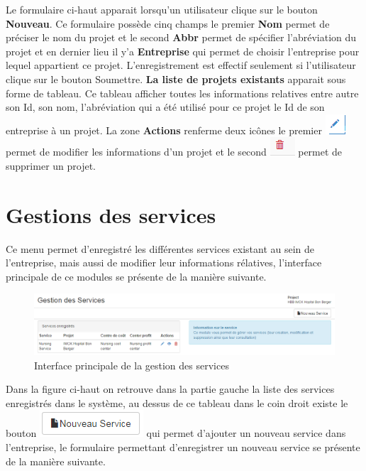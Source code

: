 \documentclass[12pt,a4paper]{report}
\begin{document}
Le formulaire ci-haut apparait lorsqu'un utilisateur clique sur le bouton \textbf{Nouveau}. Ce formulaire possède cinq champs le premier \textbf{Nom} permet de préciser le nom du projet et le second \textbf{Abbr} permet de spécifier l'abréviation du projet et en dernier lieu il y'a \textbf{Entreprise} qui permet de choisir l'entreprise pour lequel appartient ce projet.
L'enregistrement est effectif seulement si l'utilisateur clique sur le bouton Soumettre. \textbf{La liste de projets existants} apparait sous forme de tableau. Ce tableau afficher toutes les informations relatives entre autre son Id, son nom, l'abréviation qui a été utilisé pour ce projet le Id de son entreprise à un projet. La zone \textbf{Actions} renferme deux icônes le premier \includegraphics[scale=0.7]{pic/EditUser.png}  permet de modifier les informations d'un projet et le second \includegraphics[scale=0.7]{pic/DeleteWRed.png} permet de supprimer un projet.


\section{Gestions des services}
Ce menu permet d'enregistré les différentes services existant au sein de l'entreprise, mais aussi de modifier leur informations rélatives, l'interface principale de ce modules se présente de la manière suivante.

\begin{figure}[h]
\begin{center}
\includegraphics[width=14cm]{pic/AdminService.png}
\end{center}
\caption{Interface principale de la gestion des services}
\label{Interface principale de la gestion des services}
\end{figure}

Dans la figure ci-haut on retrouve dans la partie gauche la liste des services enregistrés dans le système, au dessus de ce tableau dans le coin droit existe le bouton \includegraphics[scale=1]{pic/NewService.png} qui permet d'ajouter un nouveau service dans l'entreprise, le formulaire permettant d'enregistrer un nouveau service se présente de la manière suivante.
\end{document}
